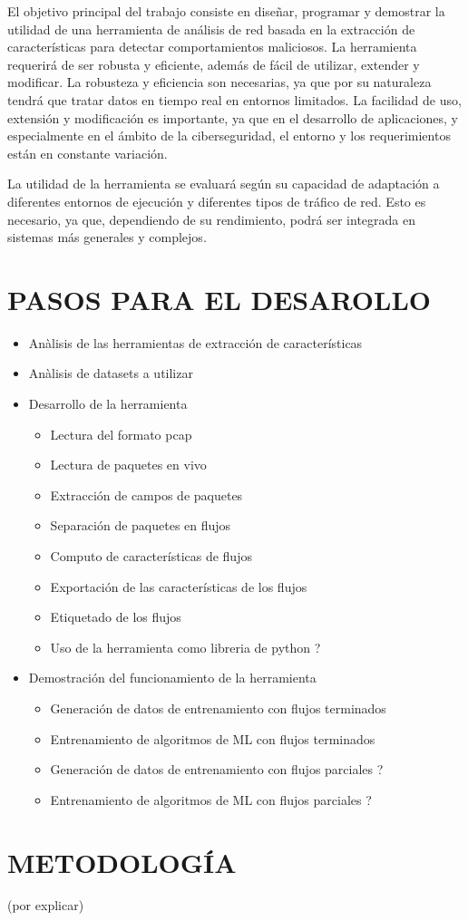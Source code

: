 El objetivo principal del trabajo consiste en diseñar, programar y demostrar la utilidad de una herramienta de análisis de red basada en la extracción de características para detectar comportamientos maliciosos. La herramienta requerirá de ser robusta y eficiente, además de fácil de utilizar, extender y modificar. La robusteza y eficiencia son necesarias, ya que por su naturaleza tendrá que tratar datos en tiempo real en entornos limitados. La facilidad de uso, extensión y modificación es importante, ya que en el desarrollo de aplicaciones, y especialmente en el ámbito de la ciberseguridad, el entorno y los requerimientos están en constante variación.

La utilidad de la herramienta se evaluará según su capacidad de adaptación a diferentes entornos de ejecución y diferentes tipos de tráfico de red. Esto es necesario, ya que, dependiendo de su rendimiento, podrá ser integrada en sistemas más generales y complejos.

\section*{PASOS PARA EL DESAROLLO}

\begin{itemize}
  \item Anàlisis de las herramientas de extracción de características
  \item Anàlisis de datasets a utilizar
  \item Desarrollo de la herramienta
  \begin{itemize}
    \item Lectura del formato pcap
    \item Lectura de paquetes en vivo
    \item Extracción de campos de paquetes
    \item Separación de paquetes en flujos
    \item Computo de características de flujos
    \item Exportación de las características de los flujos
    \item Etiquetado de los flujos
    \item Uso de la herramienta como libreria de python ?
  \end{itemize}
  \item Demostración del funcionamiento de la herramienta
  \begin{itemize}
    \item Generación de datos de entrenamiento con flujos terminados
    \item Entrenamiento de algoritmos de ML con flujos terminados
    \item Generación de datos de entrenamiento con flujos parciales ?
    \item Entrenamiento de algoritmos de ML con flujos parciales ?
  \end{itemize}
\end{itemize}

\section*{METODOLOGÍA}

(por explicar)
